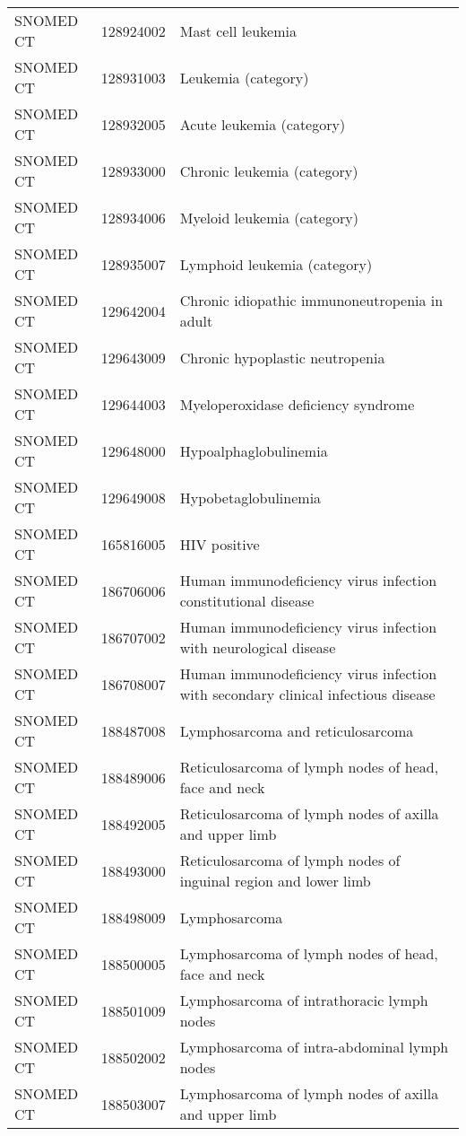 \begin{table}[ht]
\begin{tabular}{lll}
  SNOMED CT & 128924002 & Mast cell leukemia \\ 
  SNOMED CT & 128931003 & Leukemia (category) \\ 
  SNOMED CT & 128932005 & Acute leukemia (category) \\ 
  SNOMED CT & 128933000 & Chronic leukemia (category) \\ 
  SNOMED CT & 128934006 & Myeloid leukemia (category) \\ 
  SNOMED CT & 128935007 & Lymphoid leukemia (category) \\ 
  SNOMED CT & 129642004 & Chronic idiopathic immunoneutropenia in adult \\ 
  SNOMED CT & 129643009 & Chronic hypoplastic neutropenia \\ 
  SNOMED CT & 129644003 & Myeloperoxidase deficiency syndrome \\ 
  SNOMED CT & 129648000 & Hypoalphaglobulinemia \\ 
  SNOMED CT & 129649008 & Hypobetaglobulinemia \\ 
  SNOMED CT & 165816005 & HIV positive \\ 
  SNOMED CT & 186706006 & Human immunodeficiency virus infection constitutional disease \\ 
  SNOMED CT & 186707002 & Human immunodeficiency virus infection with neurological disease \\ 
  SNOMED CT & 186708007 & Human immunodeficiency virus infection with secondary clinical infectious disease \\ 
  SNOMED CT & 188487008 & Lymphosarcoma and reticulosarcoma \\ 
  SNOMED CT & 188489006 & Reticulosarcoma of lymph nodes of head, face and neck \\ 
  SNOMED CT & 188492005 & Reticulosarcoma of lymph nodes of axilla and upper limb \\ 
  SNOMED CT & 188493000 & Reticulosarcoma of lymph nodes of inguinal region and lower limb \\ 
  SNOMED CT & 188498009 & Lymphosarcoma \\ 
  SNOMED CT & 188500005 & Lymphosarcoma of lymph nodes of head, face and neck \\ 
  SNOMED CT & 188501009 & Lymphosarcoma of intrathoracic lymph nodes \\ 
  SNOMED CT & 188502002 & Lymphosarcoma of intra-abdominal lymph nodes \\ 
  SNOMED CT & 188503007 & Lymphosarcoma of lymph nodes of axilla and upper limb \\ 

\end{tabular}
\end{table}
